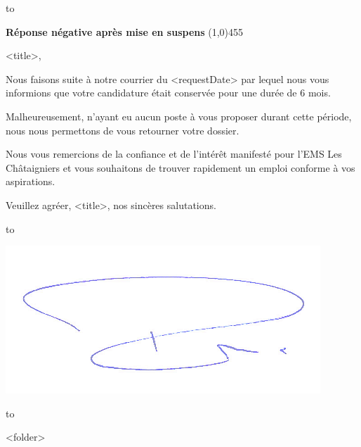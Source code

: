 \documentclass[a4paper, 12pt]{letter}
\begin{document}

\hbox to 

\bigbreak

\begin{flushleft}
	\textbf{Réponse négative après mise en suspens}
	\line(1,0){455}
\end{flushleft}
\bigbreak

<title>,

Nous faisons suite à notre courrier du <requestDate> par lequel nous vous informions que votre candidature était conservée pour une durée de 6 mois.

Malheureusement, n’ayant eu aucun poste à vous proposer durant cette période, nous nous permettons de vous retourner votre dossier. 

Nous vous remercions de la confiance et de l’intérêt manifesté pour l’EMS Les Châtaigniers et vous souhaitons de trouver rapidement un emploi conforme à vos aspirations.

Veuillez agréer, <title>, nos sincères salutations.

\bigbreak
\bigbreak
\bigbreak
\bigbreak

\hbox to 
\begin{flushright}
\includegraphics{sign.png}
\end{flushright}

\hbox to 

\bigbreak
\bigbreak

<folder>
\end{document}
